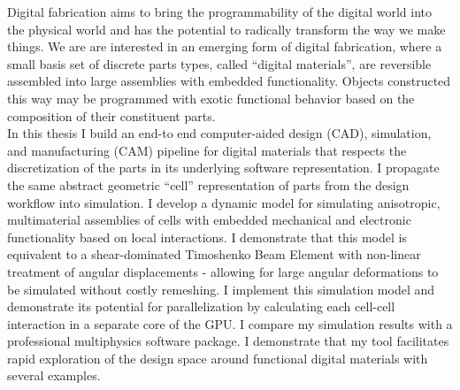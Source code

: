 % 
% 
%

Digital fabrication aims to bring the programmability of the digital world into the physical world and has the potential to radically transform the way we make things.  We are are interested in an emerging form of digital fabrication, where a small basis set of discrete parts types, called ``digital materials'', are reversible assembled into large assemblies with embedded functionality.  Objects constructed this way may be programmed with exotic functional behavior based on the composition of their constituent parts.\\

In this thesis I build an end-to end computer-aided design (CAD), simulation, and manufacturing (CAM) pipeline for digital materials that respects the discretization of the parts in its underlying software representation.  I propagate the same abstract geometric ``cell'' representation of parts from the design workflow into simulation.  I develop a dynamic model for simulating anisotropic, multimaterial assemblies of cells with embedded mechanical and electronic functionality based on local interactions.  I demonstrate that this model is equivalent to a shear-dominated Timoshenko Beam Element with non-linear treatment of angular displacements - allowing for large angular deformations to be simulated without costly remeshing.  I implement this simulation model and demonstrate its potential for parallelization by calculating each cell-cell interaction in a separate core of the GPU.  I compare my simulation results with a professional multiphysics software package.  I demonstrate that my tool facilitates rapid exploration of the design space around functional digital materials with several examples.
